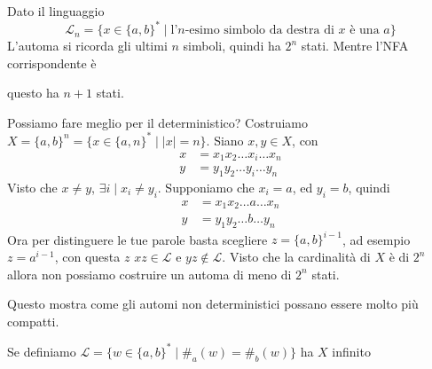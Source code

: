 \documentclass[12pt]{article}
\begin{document}
\begin{tcolorbox}
	Dato il linguaggio 
	$$ \mathcal{L}_n = \{ x \in \{ a, b \}^* \mid \text{l'$n$-esimo simbolo da destra di $x$ è una $a$} \} $$
	L'automa si ricorda gli ultimi $n$ simboli, quindi ha $2^n$ stati.
	Mentre l'NFA corrispondente è 
	\begin{center}
	\end{center}
	questo ha $n + 1$ stati.

	Possiamo fare meglio per il deterministico?
	Costruiamo $X = \{a, b\}^n = \{ x \in \{a, n\}^* \mid |x| = n \} $.
	Siano $x, y \in X$, con 
	\begin{align*}
		x &= x_1 x_2 \dots x_i \dots x_n \\
		y &= y_1 y_2 \dots y_i \dots y_n 
	\end{align*}
	Visto che $x \neq y$, $\exists i \mid x_i \neq y_i$.
	Supponiamo che $x_i = a$, ed $y_i = b$, quindi
	\begin{align*}
		x &= x_1 x_2 \dots a \dots x_n \\
		y &= y_1 y_2 \dots b \dots y_n 
	\end{align*}
	Ora per distinguere le tue parole basta scegliere $z = \{a, b\}^{i - 1}$, ad esempio $z = a^{i - 1}$, con questa $z$ $xz \in \mathcal{L}$ e $yz \not \in \mathcal{L}$.
	Visto che la cardinalità di $X$ è di $2^n$ allora non possiamo costruire un automa di meno di $2^n$ stati.

	Questo mostra come gli automi non deterministici possano essere molto più compatti.
\end{tcolorbox}
\begin{tcolorbox}
	Se definiamo $\mathcal{L} = \{ w \in \{ a, b\}^* \mid \#_a(w) = \#_b(w) \}$ ha $X$ infinito %
\end{tcolorbox}
\end{document}
